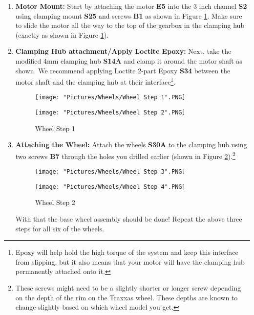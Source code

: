 \documentclass[12pt]{article}
\begin{document}
\begin{enumerate}
\item \textbf{Motor Mount:} Start by attaching the motor \textbf{E5} into the 3 inch channel \textbf{S2} using clamping mount \textbf{S25} and screws \textbf{B1} as shown in Figure \ref{wheel step 1}. Make sure to slide the motor all the way  to the top of the gearbox in the clamping hub (exactly as shown in Figure \ref{wheel step 1}).


\item \textbf{Clamping Hub attachment/Apply Loctite Epoxy:} Next, take the modified 4mm clamping hub \textbf{S14A} and clamp it around the motor shaft as shown. We recommend applying Loctite 2-part Epoxy \textbf{S34} between the motor shaft and the clamping hub at their interface\footnote{Epoxy will help hold the high torque of the system and keep this interface from slipping, but it also means that your motor will have the clamping hub permanently attached onto it.}.

\begin{figure}[H]
  \centering
  \begin{minipage}[b]{0.45\textwidth}
    \texttt{[image: "Pictures/Wheels/Wheel Step 1".PNG]}
  \end{minipage}
  \hfill
  \begin{minipage}[b]{0.45\textwidth}
    \texttt{[image: "Pictures/Wheels/Wheel Step 2".PNG]}
  \end{minipage}
  \caption{Wheel Step 1}
  \label{wheel step 1}
\end{figure}
\item \textbf{Attaching the Wheel:} Attach the wheels \textbf{S30A} to the clamping hub using two screws \textbf{B7} through the holes you drilled earlier (shown in Figure \ref{wheel step 2}).\footnote{These screws might need to be a slightly shorter or longer screw depending on the depth of the rim on the Traxxas wheel.  These depths are known to change slightly based on which wheel model you get.}

\begin{figure}[H]
  \centering
  \begin{minipage}[b]{0.45\textwidth}
    \texttt{[image: "Pictures/Wheels/Wheel Step 3".PNG]}
  \end{minipage}
  \hfill
  \begin{minipage}[b]{0.45\textwidth}
    \texttt{[image: "Pictures/Wheels/Wheel Step 4".PNG]}
  \end{minipage}
  \caption{Wheel Step 2}
  \label{wheel step 2}
\end{figure}

With that the base wheel assembly should be done! Repeat the above three steps for all six of the wheels.

\end{enumerate}
\end{document}
